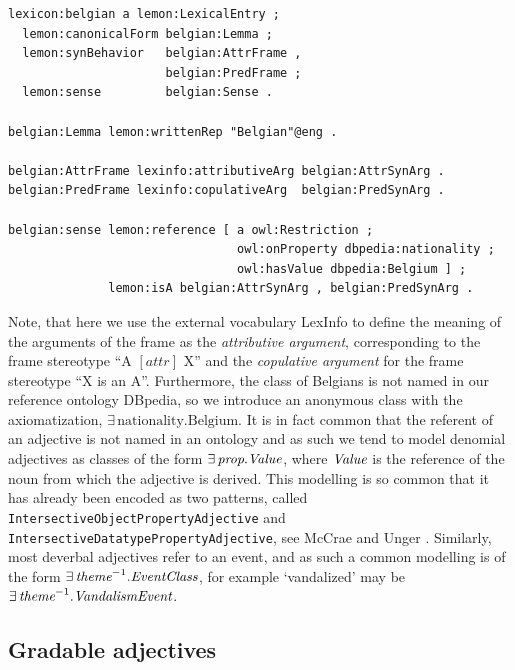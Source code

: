 \documentclass[11pt]{article}
\begin{document}
\begin{verbatim}
lexicon:belgian a lemon:LexicalEntry ;
  lemon:canonicalForm belgian:Lemma ;
  lemon:synBehavior   belgian:AttrFrame , 
                      belgian:PredFrame ;
  lemon:sense         belgian:Sense .

belgian:Lemma lemon:writtenRep "Belgian"@eng .

belgian:AttrFrame lexinfo:attributiveArg belgian:AttrSynArg .
belgian:PredFrame lexinfo:copulativeArg  belgian:PredSynArg .

belgian:sense lemon:reference [ a owl:Restriction ;
                                owl:onProperty dbpedia:nationality ;
                                owl:hasValue dbpedia:Belgium ] ;
              lemon:isA belgian:AttrSynArg , belgian:PredSynArg .
\end{verbatim}

Note, that here we use the external vocabulary LexInfo \cite{cimiano2011lexinfo} 
to define the meaning of the arguments of the frame as the \emph{attributive 
argument}, corresponding to the frame stereotype ``A $[attr]$ X'' and the 
\emph{copulative argument} for the frame stereotype ``X is an A''. Furthermore,
the class of Belgians is not named in our reference ontology DBpedia, so we 
introduce an anonymous class with the axiomatization, 
$\exists\,\text{nationality}.\text{Belgium}$. It is in fact common that the 
referent of an adjective is not named in an ontology and as such we tend to 
model denomial adjectives as classes of the form $\exists\,\text{\em prop}.\text{\em Value}$, 
where $\text{\em Value}$ is the reference of the noun from which the adjective is
derived. This modelling is so common that it has already been encoded as two
patterns, called {\tt IntersectiveObjectPropertyAdjective} and {\tt
IntersectiveDatatypePropertyAdjective}, see McCrae and Unger .
Similarly, most deverbal adjectives refer to an event, and as such
a common modelling is of the form $\exists\,\text{\em theme}^{-1}.\text{\em EventClass}$, 
for example `vandalized' may be $\exists\,\text{\em theme}^{-1}.\text{\em VandalismEvent}$.

\subsection{Gradable adjectives}
\end{document}
